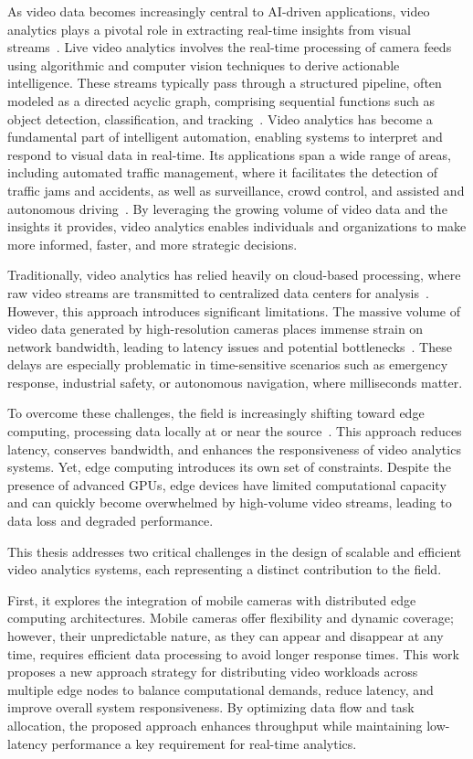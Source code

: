 As video data becomes increasingly central to AI-driven applications, video analytics plays a pivotal role in extracting real-time insights from visual streams~\cite{}. Live video analytics involves the real-time processing of camera feeds using algorithmic and computer vision techniques to derive actionable intelligence. These streams typically pass through a structured pipeline, often modeled as a directed acyclic graph, comprising sequential functions such as object detection, classification, and tracking~\cite{}. Video analytics has become a fundamental part of intelligent automation, enabling systems to interpret and respond to visual data in real-time. Its applications span a wide range of areas, including automated traffic management, where it facilitates the detection of traffic jams and accidents, as well as surveillance, crowd control, and assisted and autonomous driving~\cite{}. By leveraging the growing volume of video data and the insights it provides, video analytics enables individuals and organizations to make more informed, faster, and more strategic decisions.

Traditionally, video analytics has relied heavily on cloud-based processing, where raw video streams are transmitted to centralized data centers for analysis~\cite{}. However, this approach introduces significant limitations. The massive volume of video data generated by high-resolution cameras places immense strain on network bandwidth, leading to latency issues and potential bottlenecks~\cite{}. These delays are especially problematic in time-sensitive scenarios such as emergency response, industrial safety, or autonomous navigation, where milliseconds matter.

To overcome these challenges, the field is increasingly shifting toward edge computing, processing data locally at or near the source~\cite{}. This approach reduces latency, conserves bandwidth, and enhances the responsiveness of video analytics systems. Yet, edge computing introduces its own set of constraints. Despite the presence of advanced GPUs, edge devices have limited computational capacity and can quickly become overwhelmed by high-volume video streams, leading to data loss and degraded performance.

This thesis addresses two critical challenges in the design of scalable and efficient video analytics systems, each representing a distinct contribution to the field.

First, it explores the integration of mobile cameras with distributed edge computing architectures. Mobile cameras offer flexibility and dynamic coverage; however, their unpredictable nature, as they can appear and disappear at any time, requires efficient data processing to avoid longer response times. This work proposes a new approach strategy for distributing video workloads across multiple edge nodes to balance computational demands, reduce latency, and improve overall system responsiveness. By optimizing data flow and task allocation, the proposed approach enhances throughput while maintaining low-latency performance a key requirement for real-time analytics.

